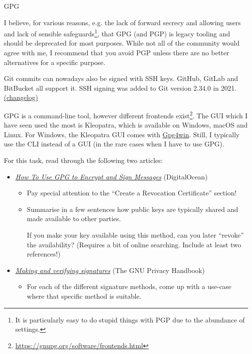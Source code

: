 \documentclass{homework}
\begin{document}
\begin{task}{GPG}
  \begin{tcolorbox}
    I believe, for various reasons, e.g. the lack of forward secrecy and allowing users and lack of sensible safeguards\footnote{It is particularly easy to do stupid things with PGP due to the abundance of settings.}, that GPG (and PGP) is legacy tooling and should be deprecated for most purposes.
    While not all of the community would agree with me, I recommend that you avoid PGP unless there are no better alternatives for a specific purpose.
  \end{tcolorbox}

  \begin{tcolorbox}
    Git commits can nowadays also be signed with SSH keys.
    GitHub, GitLab and BitBucket all support it.
    SSH signing was added to Git version 2.34.0 in 2021.
    \href{https://github.com/git/git/blob/master/Documentation/RelNotes/2.34.0.txt}{(changelog)}
  \end{tcolorbox}

  GPG is a command-line tool, however different frontends exist\footnote{\url{https://gnupg.org/software/frontends.html}}.
  The GUI which I have seen used the most is Kleopatra, which is available on Windows, macOS and Linux.
  For Windows, the Kleopatra GUI comes with \href{https://gpg4win.org/index.html}{Gpg4win}.
  Still, I typically use the CLI instead of a GUI (in the rare cases when I have to use GPG).

  For this task, read through the following two articles:
  \begin{itemize}
    \item \href{https://www.digitalocean.com/community/tutorials/how-to-use-gpg-to-encrypt-and-sign-messages}{\textit{How To Use GPG to Encrypt and Sign Messages}} (DigitalOcean)
    \begin{itemize}
      \item Pay special attention to the \enquote{Create a Revocation Certificate} section!
      \item Summarise in a few sentences how public keys are typically shared and made available to other parties.
      
      If you make your key available using this method, can you later \enquote{revoke} the availability?
      (Requires a bit of online searching. Include at least two references!)
    \end{itemize}
    \item \href{https://www.gnupg.org/gph/en/manual/x135.html}{\textit{Making and verifying signatures}} (The GNU Privacy Handbook)
    \begin{itemize}
      \item For each of the different signature methods, come up with a use-case where that specific method is suitable.
    \end{itemize}
  \end{itemize}


\end{task}
\end{document}
